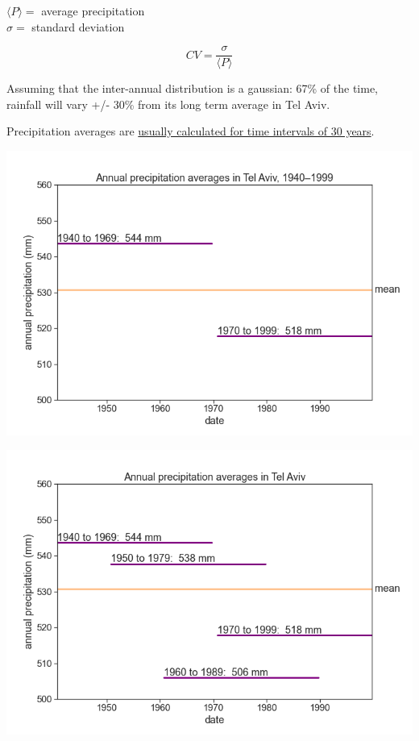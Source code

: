 \documentclass[
  letterpaper,
  DIV=11,
  numbers=noendperiod]{scrreprt}
\begin{document}
\(\langle{P}\rangle=\) average precipitation\\
\(\sigma=\) standard deviation

\[CV = \frac{\sigma}{\langle{P}\rangle}\]

Assuming that the inter-annual distribution is a gaussian: 67\% of the
time, rainfall will vary +/- 30\% from its long term average in Tel
Aviv.

Precipitation averages are
\href{https://www.ncdc.noaa.gov/news/defining-climate-normals-new-ways}{usually
calculated for time intervals of 30 years}.

\includegraphics{archive/figures/mean_tel_aviv_2_windows.png}

\includegraphics{archive/figures/mean_tel_aviv_4_windows.png}
\end{document}
